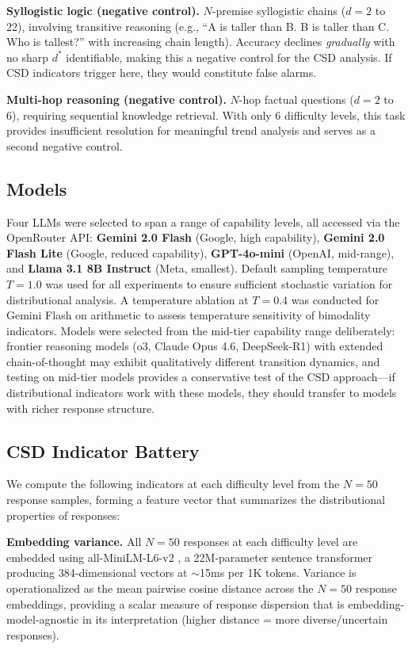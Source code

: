 \documentclass[11pt,letterpaper]{article}
\begin{document}
\textbf{Syllogistic logic (negative control).} $N$-premise syllogistic chains ($d = 2$ to 22), involving transitive reasoning (e.g., ``A is taller than B. B is taller than C. Who is tallest?'' with increasing chain length). Accuracy declines \emph{gradually} with no sharp $d^*$ identifiable, making this a negative control for the CSD analysis. If CSD indicators trigger here, they would constitute false alarms.

\textbf{Multi-hop reasoning (negative control).} $N$-hop factual questions ($d = 2$ to 6), requiring sequential knowledge retrieval. With only 6 difficulty levels, this task provides insufficient resolution for meaningful trend analysis and serves as a second negative control.

\subsection{Models}

Four LLMs were selected to span a range of capability levels, all accessed via the OpenRouter API: \textbf{Gemini 2.0 Flash} (Google, high capability), \textbf{Gemini 2.0 Flash Lite} (Google, reduced capability), \textbf{GPT-4o-mini} (OpenAI, mid-range), and \textbf{Llama 3.1 8B Instruct} (Meta, smallest). Default sampling temperature $T = 1.0$ was used for all experiments to ensure sufficient stochastic variation for distributional analysis. A temperature ablation at $T = 0.4$ was conducted for Gemini Flash on arithmetic to assess temperature sensitivity of bimodality indicators. Models were selected from the mid-tier capability range deliberately: frontier reasoning models (o3, Claude Opus 4.6, DeepSeek-R1) with extended chain-of-thought may exhibit qualitatively different transition dynamics, and testing on mid-tier models provides a conservative test of the CSD approach---if distributional indicators work with these models, they should transfer to models with richer response structure.

\subsection{CSD Indicator Battery}

We compute the following indicators at each difficulty level from the $N = 50$ response samples, forming a feature vector that summarizes the distributional properties of responses:

\textbf{Embedding variance.} All $N=50$ responses at each difficulty level are embedded using all-MiniLM-L6-v2 \cite{reimers2019}, a 22M-parameter sentence transformer producing 384-dimensional vectors at $\sim$15ms per 1K tokens. Variance is operationalized as the mean pairwise cosine distance across the $N=50$ response embeddings, providing a scalar measure of response dispersion that is embedding-model-agnostic in its interpretation (higher distance = more diverse/uncertain responses).
\end{document}
